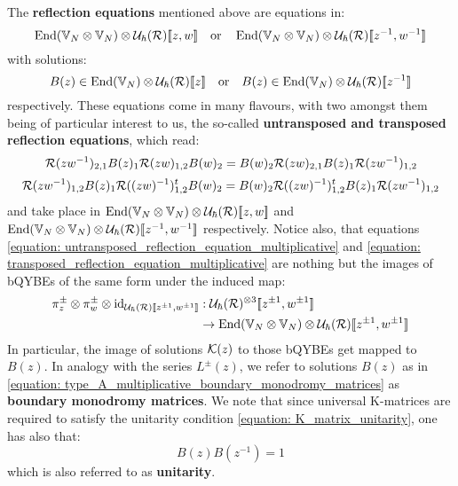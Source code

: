         The \textbf{reflection equations} mentioned above are equations in:
            $$\End( \bbV_N \tensor \bbV_N ) \tensor \calU_{\hbar}(\calR)[\![z, w]\!] \quad \text{or} \quad \End( \bbV_N \tensor \bbV_N ) \tensor \calU_{\hbar}(\calR)[\![z^{-1}, w^{-1}]\!]$$
        with solutions:
            \begin{equation} \label{equation: type_A_multiplicative_boundary_monodromy_matrices}
                B(z) \in \End(\bbV_N) \tensor \calU_{\hbar}(\calR)[\![z]\!] \quad \text{or} \quad B(z) \in \End(\bbV_N) \tensor \calU_{\hbar}(\calR)[\![z^{-1}]\!]
            \end{equation}
        respectively. These equations come in many flavours, with two amongst them being of particular interest to us, the so-called \textbf{untransposed and transposed reflection equations}, which read:
            \begin{equation} \label{equation: untransposed_reflection_equation_multiplicative}
                \mathcal{R}(zw^{-1})_{2, 1} B(z)_1 \mathcal{R}(zw)_{1, 2} B(w)_2 = B(w)_2 \mathcal{R}(zw)_{2, 1} B(z)_1 \mathcal{R}(zw^{-1})_{1, 2}
            \end{equation}
            \begin{equation} \label{equation: transposed_reflection_equation_multiplicative}
                \mathcal{R}(zw^{-1})_{1, 2} B(z)_1 \mathcal{R}( (zw)^{-1} )_{1, 2}^t B(w)_2 = B(w)_2 \mathcal{R}( (zw)^{-1} )_{1, 2}^t B(z)_1 \mathcal{R}(zw^{-1})_{1, 2}
            \end{equation}
        and take place in $\End( \bbV_N \tensor \bbV_N ) \tensor \calU_{\hbar}(\calR)[\![z, w]\!]$ and $\End( \bbV_N \tensor \bbV_N ) \tensor \calU_{\hbar}(\calR)[\![z^{-1}, w^{-1}]\!]$ respectively. Notice also, that equations \eqref{equation: untransposed_reflection_equation_multiplicative} and \eqref{equation: transposed_reflection_equation_multiplicative} are nothing but the images of bQYBEs of the same form under the induced map:
            $$
                \begin{aligned}
                    \pi_z^{\pm} \tensor \pi_w^{\pm} \tensor \id_{\calU_{\hbar}(\calR)[\![z^{\pm 1}, w^{\pm 1}]\!]} & : \calU_{\hbar}(\calR)^{\tensor 3}[\![z^{\pm 1}, w^{\pm 1}]\!]
                    \\
                    & \to \End( \bbV_N \tensor \bbV_N ) \tensor \calU_{\hbar}(\calR)[\![z^{\pm 1}, w^{\pm 1}]\!]
                \end{aligned}
            $$
        In particular, the image of solutions $\mathcal{K}(z)$ to those bQYBEs get mapped to $B(z)$. In analogy with the series $L^{\pm}(z)$, we refer to solutions $B(z)$ as in \eqref{equation: type_A_multiplicative_boundary_monodromy_matrices} as \textbf{boundary monodromy matrices}. We note that since universal K-matrices are required to satisfy the unitarity condition \eqref{equation: K_matrix_unitarity}, one has also that:
            \begin{equation} \label{equation: type_A_multiplicative_boundary_monodromy_matrices_unitarity}
                B(z) B(z^{-1}) = 1
            \end{equation}
        which is also referred to as \textbf{unitarity}.
        
